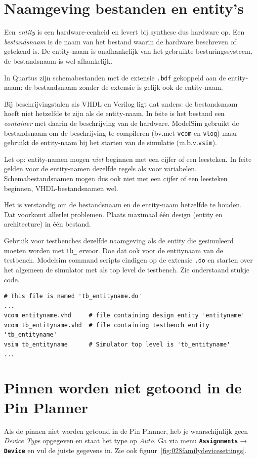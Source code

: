 \documentclass[a4paper,12pt,fleqn,twoside]{book}
\newcommand{\menu}[1]{\texttt{\textbf{#1}}}
\newcommand{\naam}[1]{\texttt{#1}}
\def\pijl{$\rightarrow$}%
\begin{document}
\section{Naamgeving bestanden en entity's}
Een \textsl{entity} is een hardware-eenheid en levert bij synthese
dus hardware op. Een \textsl{bestandsnaam} is de naam van het bestand
waarin de hardware beschreven of getekend is. De entity-naam is
onafhankelijk van het gebruikte besturingssysteem, de bestandsnaam is
wel afhankelijk.

In Quartus zijn schemabestanden met de extensie \naam{.bdf}
gekoppeld aan de entity-naam: de bestandsnaam zonder de extensie
is gelijk ook de entity-naam.

Bij beschrijvingstalen als VHDL en Verilog ligt dat anders: de
bestandsnaam hoeft niet hetzelfde te zijn als de entity-naam. In feite
is het bestand een \textsl{container} met daarin de beschrijving
van de hardware. ModelSim gebruikt de bestandsnaam om de beschrijving
te compileren (bv.\@ met \naam{vcom} en \naam{vlog}) maar gebruikt de
entity-naam bij het starten van de simulatie (m.b.v.\@ \naam{vsim}).

Let op: entity-namen mogen \textsl{niet} beginnen met een cijfer of
een leesteken. In feite gelden voor de entity-namen dezelfde regels als
voor variabelen. Schemabestandsnamen mogen dus ook niet met een cijfer
of een leesteken beginnen, VHDL-bestandsnamen wel.

Het is verstandig om de bestandsnaam en de entity-naam hetzelfde te houden.
Dat voorkomt allerlei problemen. Plaats maximaal \'e\'en design
(entity en architecture) in \'e\'en bestand.

Gebruik voor testbenches dezelfde naamgeving als de entity die gesimuleerd
moeten worden met \lstinline|tb_| ervoor. Doe dat ook voor de entitynaam van
de testbench. Modelsim command scripts eindigen op de extensie \lstinline|.do|
en starten over het algemeen de simulator met als top level de testbench.
Zie onderstaand stukje code.

\begin{lstlisting}[language=tclfix,numbers=none,belowskip=-3.5ex]
# This file is named 'tb_entityname.do'
...
vcom entityname.vhd     # file containing design entity 'entityname'
vcom tb_entityname.vhd  # file containing testbench entity 'tb_entityname'
vsim tb_entityname      # Simulator top level is 'tb_entityname'
...
\end{lstlisting}

\section{Pinnen worden niet getoond in de Pin Planner}
Als de pinnen niet worden getoond in de Pin Planner, heb je waarschijnlijk
geen \textsl{Device Type} opgegeven en staat het type op \textsl{Auto}. Ga
via menu \menu{Assignments\pijl{}Device} en vul de juiste gegevens in.
Zie ook figuur~\ref{fig:028familydevicesettings}.
\end{document}

